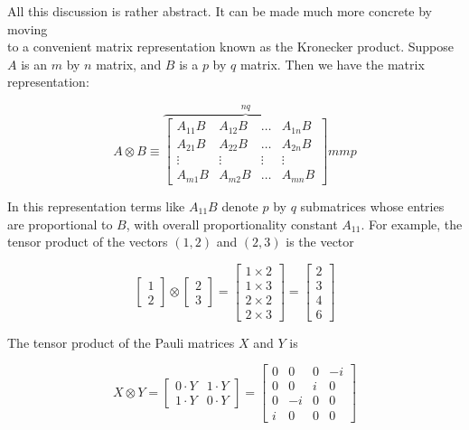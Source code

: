 \documentclass[
	11pt, %
	fleqn, %
	a4paper, %
]{LegrandOrangeBook}
\begin{document}
All this discussion is rather abstract. It can be made much more concrete by moving\\
to a convenient matrix representation known as the Kronecker product. Suppose $A$ is an $m$ by $n$ matrix, and $B$ is a $p$ by $q$ matrix. Then we have the matrix representation:

$$
A \otimes B \equiv \overbrace{\left[\begin{array}{cccc}
A_{11} B & A_{12} B & \ldots & A_{1 n} B \\
A_{21} B & A_{22} B & \ldots & A_{2 n} B \\
\vdots & \vdots & \vdots & \vdots \\
A_{m 1} B & A_{m 2} B & \ldots & A_{m n} B
\end{array}\right]}^{n q} m m p
$$

In this representation terms like $A_{11} B$ denote $p$ by $q$ submatrices whose entries are proportional to $B$, with overall proportionality constant $A_{11}$. For example, the tensor product of the vectors $(1,2)$ and $(2,3)$ is the vector

$$
\left[\begin{array}{l}
1 \\
2
\end{array}\right] \otimes\left[\begin{array}{l}
2 \\
3
\end{array}\right]=\left[\begin{array}{l}
1 \times 2 \\
1 \times 3 \\
2 \times 2 \\
2 \times 3
\end{array}\right]=\left[\begin{array}{l}
2 \\
3 \\
4 \\
6
\end{array}\right]
$$

The tensor product of the Pauli matrices $X$ and $Y$ is

$$
X \otimes Y=\left[\begin{array}{cc}
0 \cdot Y & 1 \cdot Y \\
1 \cdot Y & 0 \cdot Y
\end{array}\right]=\left[\begin{array}{cccc}
0 & 0 & 0 & -i \\
0 & 0 & i & 0 \\
0 & -i & 0 & 0 \\
i & 0 & 0 & 0
\end{array}\right]
$$
\end{document}
